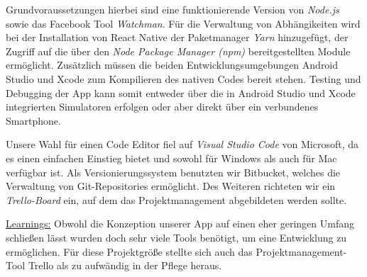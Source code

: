 Grundvoraussetzungen hierbei sind eine funktionierende Version von \emph{Node.js} sowie das Facebook Tool \emph{Watchman}.
Für die Verwaltung von Abhängikeiten wird bei der Installation von React Native der Paketmanager \emph{Yarn} hinzugefügt, der Zugriff auf die über den \emph{Node Package Manager (npm)} bereitgestellten Module ermöglicht.
Zusätzlich müssen die beiden Entwicklungsumgebungen Android Studio und Xcode zum Kompilieren des nativen Codes bereit stehen.
Testing und Debugging der App kann somit entweder über die in Android Studio und Xcode integrierten Simulatoren erfolgen oder aber direkt über ein verbundenes Smartphone.

Unsere Wahl für einen Code Editor fiel auf \emph{Visual Studio Code} von Microsoft, da es einen einfachen Einstieg bietet und sowohl für Windows als auch für Mac verfügbar ist.
Als Versionierungssystem benutzten wir Bitbucket, welches die Verwaltung von Git-Repositories ermöglicht.
Des Weiteren richteten wir ein \emph{Trello-Board} ein, auf dem das Projektmanagement abgebildeten werden sollte.

\underline{Learnings:}
Obwohl die Konzeption unserer App auf einen eher geringen Umfang schließen lässt wurden doch sehr viele Tools benötigt, um eine Entwicklung zu ermöglichen.
Für diese Projektgröße stellte sich auch das Projektmanagement-Tool Trello als zu aufwändig in der Pflege heraus.



